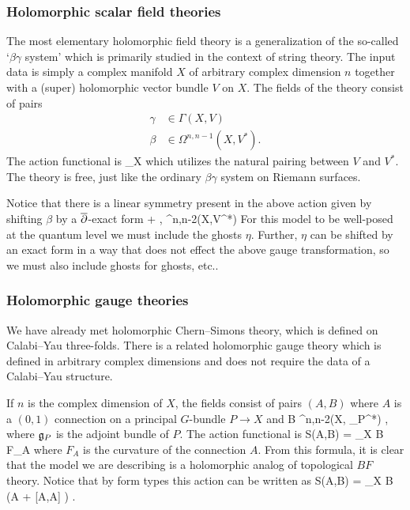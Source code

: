 \documentclass[11pt]{amsart}
\begin{document}
\subsubsection{Holomorphic scalar field theories}

The most elementary holomorphic field theory is a generalization of the so-called `$\beta\gamma$ system' which is primarily studied in the context of string theory.
The input data is simply a complex manifold $X$ of arbitrary complex dimension $n$ together with a (super) holomorphic vector bundle $V$ on $X$.
The fields of the theory consist of pairs 
\begin{align*}
\gamma & \in \Gamma(X,V)\\
\beta & \in \Omega^{n,n-1}(X,V^*) .
\end{align*}
The action functional is 
\beqn
\int_X \beta \wedge \dbar \gamma 
\eeqn
which utilizes the natural pairing between $V$ and $V^*$. 
The theory is free, just like the ordinary $\beta\gamma$ system on Riemann surfaces.

Notice that there is a linear symmetry present in the above action given by shifting $\beta$ by a ${\overline{\partial}}$-exact form
\beqn
\beta \mapsto \beta + \dbar \eta , \quad \eta \in \Omega^{n,n-2}(X,V^*)
\eeqn
For this model to be well-posed at the quantum level we must include the ghosts $\eta$.
Further, $\eta$ can be shifted by an exact form in a way that does not effect the above gauge transformation, so we must also include ghosts for ghosts, etc..

\subsubsection{Holomorphic gauge theories}

We have already met holomorphic Chern--Simons theory, which is defined on Calabi--Yau three-folds.
There is a related holomorphic gauge theory which is defined in arbitrary complex dimensions and does not require the data of a Calabi--Yau structure. 

If $n$ is the complex dimension of $X$, the fields consist of pairs $(A,B)$ where $A$ is a $(0,1)$ connection on a principal $G$-bundle $P \to X$ and
\beqn
B \in \Omega^{n,n-2}(X, \fg_P^*) ,
\eeqn
where $\mathfrak g_P$ is the adjoint bundle of $P$. 
The action functional is 
\beqn
S(A,B) = \int_X B \wedge F_A 
\eeqn
where $F_A$ is the curvature of the connection $A$.
From this formula, it is clear that the model we are describing is a holomorphic analog of topological $BF$ theory. 
Notice that by form types this action can be written as
\beqn
S(A,B) = \int_X B \wedge \left(\dbar A +  [A,A] \right) .
\eeqn
\end{document}
